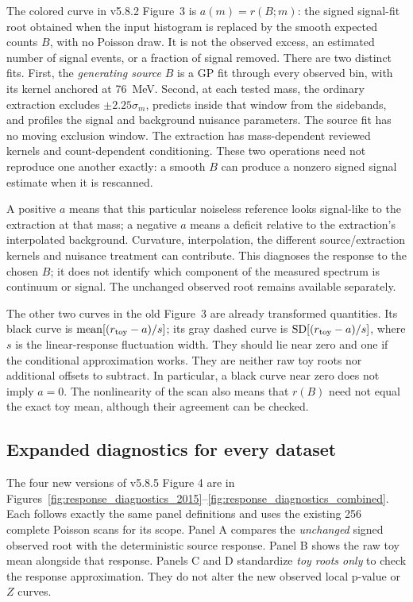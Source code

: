 \label{sec:physics-offset}
The colored curve in v5.8.2 Figure~3 is $a(m)=r(B;m)$: the signed signal-fit root obtained when the input histogram is replaced by the smooth expected counts $B$, with no Poisson draw. It is not the observed excess, an estimated number of signal events, or a fraction of signal removed. There are two distinct fits. First, the \emph{generating source} $B$ is a GP fit through every observed bin, with its kernel anchored at 76~MeV. Second, at each tested mass, the ordinary extraction excludes $\pm2.25\sigma_m$, predicts inside that window from the sidebands, and profiles the signal and background nuisance parameters. The source fit has no moving exclusion window. The extraction has mass-dependent reviewed kernels and count-dependent conditioning. These two operations need not reproduce one another exactly: a smooth $B$ can produce a nonzero signed signal estimate when it is rescanned.

A positive $a$ means that this particular noiseless reference looks signal-like to the extraction at that mass; a negative $a$ means a deficit relative to the extraction's interpolated background. Curvature, interpolation, the different source/extraction kernels and nuisance treatment can contribute. This diagnoses the response to the chosen $B$; it does not identify which component of the measured spectrum is continuum or signal. The unchanged observed root remains available separately.

The other two curves in the old Figure~3 are already transformed quantities. Its black curve is $\operatorname{mean}[(r_{\rm toy}-a)/s]$; its gray dashed curve is $\operatorname{SD}[(r_{\rm toy}-a)/s]$, where $s$ is the linear-response fluctuation width. They should lie near zero and one if the conditional approximation works. They are neither raw toy roots nor additional offsets to subtract. In particular, a black curve near zero does not imply $a=0$. The nonlinearity of the scan also means that $r(B)$ need not equal the exact toy mean, although their agreement can be checked.

\subsection{Expanded diagnostics for every dataset}
The four new versions of v5.8.5 Figure 4 are in Figures~\ref{fig:response_diagnostics_2015}--\ref{fig:response_diagnostics_combined}. Each follows exactly the same panel definitions and uses the existing 256 complete Poisson scans for its scope. Panel A compares the \emph{unchanged} signed observed root with the deterministic source response. Panel B shows the raw toy mean alongside that response. Panels C and D standardize \emph{toy roots only} to check the response approximation. They do not alter the new observed local p-value or $Z$ curves.

